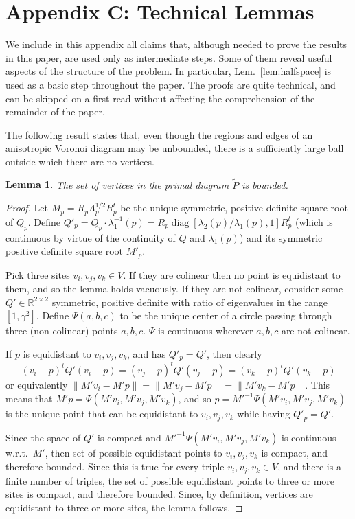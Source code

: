 \documentclass[11pt]{article}
\newtheorem{lemma}[theorem]{Lemma}
\newcommand{\diag}{\mathop{\mathrm{diag}}}
\begin{document}
\setcounter{section}{6}
\section*{Appendix C: Technical Lemmas}\label{app:technical}

We include in this appendix all claims that, 
although needed to prove the results in this paper, 
are used only as intermediate steps. 
Some of them reveal useful aspects of the structure of the problem. 
In particular, Lem.~\ref{lem:halfspace} is used as a basic step throughout the
paper. 
The proofs are quite technical, and can be skipped on a first read without
affecting the comprehension of the remainder of the paper. 


The following result 
states that, even though the regions and edges of an 
anisotropic Voronoi diagram may be unbounded, there is a sufficiently
large ball outside which there are no vertices. 

\begin{lemma}\label{lem:bounded-vertices}
The set of vertices in the primal diagram $\tilde{P}$ is bounded. 
\end{lemma}
\begin{proof}
Let $M_p = R_p \Lambda_p^{1/2} R_p^t$ be the unique symmetric, positive definite square root of $Q_p$. 
Define $Q'_p = Q_p\cdot\lambda^{-1}_1(p) = R_p \diag\left[\lambda_2(p)/\lambda_1(p), 1\right] R_p^t$ 
(which is continuous by virtue of the continuity of $Q$ and $\lambda_1(p)$) 
and its symmetric positive definite square root $M'_p$. 

Pick three sites $v_i,v_j,v_k\in V$. If they are colinear then no point is 
equidistant to them, and so the lemma holds vacuously.  
If they are not colinear, 
consider some $Q'\in\mathbb{R}^{2\times 2}$ symmetric,
positive definite with ratio of eigenvalues in the range $[1,\gamma^2]$. 
Define  $\Psi(a,b,c)$ to be the {unique} center
of a circle passing through three (non-colinear) points $a,b,c$. $\Psi$ is
continuous wherever $a,b,c$ are not colinear. 

If $p$ is equidistant to $v_i,v_j,v_k$, and has $Q'_p=Q'$, then clearly 
\[(v_i-p)^t Q' (v_i-p) = (v_j-p)^t Q' (v_j-p) = (v_k-p)^t Q' (v_k-p) \]
or equivalently $\|M' v_i- M' p\| = \|M'v_j - M' p\| = \|M' v_k- M' p\|$. 
This means that $M' p = \Psi(M' v_i, M' v_j, M' v_k)$, 
and so $p = M'^{-1} \Psi(M' v_i, M' v_j, M' v_k)$ is the unique point
that can be equidistant to $v_i,v_j,v_k$ while having $Q'_p=Q'$.

Since the space of $Q'$ is compact and $M'^{-1} \Psi(M' v_i, M' v_j, M'
v_k)$ is continuous w.r.t.\ $M'$, then set of possible equidistant points to
$v_i,v_j,v_k$ is compact, and therefore bounded. 
Since this is true for every triple $v_i,v_j,v_k\in V$, and there is a
finite number of triples, the set of possible equidistant points to three or
more sites is compact, and therefore bounded. 
Since, by definition, vertices are equidistant to three or more sites, the lemma follows. 
\end{proof}
\end{document}
